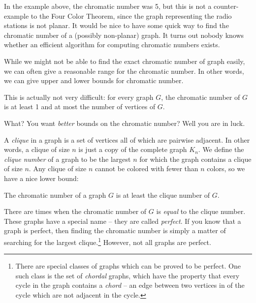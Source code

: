 \documentclass[12pt]{article}
\begin{document}
%
%

In the example above, the chromatic number was 5, but this is not a counter-example to the Four Color Theorem, since the graph representing the radio stations is not planar.  It would be nice to have some quick way to find the chromatic number of a (possibly non-planar) graph.  It turns out nobody knows whether an efficient algorithm for computing chromatic numbers exists.

While we might not be able to find the exact chromatic number of graph easily, we can often give a reasonable range for the chromatic number.  In other words, we can give upper and lower bounds for chromatic number.

This is actually not very difficult: for every graph $G$, the chromatic number of $G$ is at least 1 and at most the number of vertices of $G$.

What?  You want \emph{better} bounds on the chromatic number?  Well you are in luck.

A \emph{clique} in a graph is a set of vertices all of which are pairwise adjacent.  In other words, a clique of size $n$ is just a copy of the complete graph $K_n$.  We define the \emph{clique number} of a graph to be the largest $n$ for which the graph contains a clique of size $n$.  Any clique of size $n$ cannot be colored with fewer than $n$ colors, so we have a nice lower bound:

\begin{theorem}
The chromatic number of a graph $G$ is at least the clique number of $G$.
\end{theorem}

There are times when the chromatic number of $G$ is \emph{equal} to the clique number.  These graphs have a special name -- they are called \emph{perfect}.  If you know that a graph is perfect, then finding the chromatic number is simply a matter of searching for the largest clique.\footnote{There are special classes of graphs which can be proved to be perfect.  One such class is the set of \emph{chordal} graphs, which have the property that every cycle in the graph contains a \emph{chord} -- an edge between two vertices in of the cycle which are not adjacent in the cycle.}  However, not all graphs are perfect.
\end{document}
